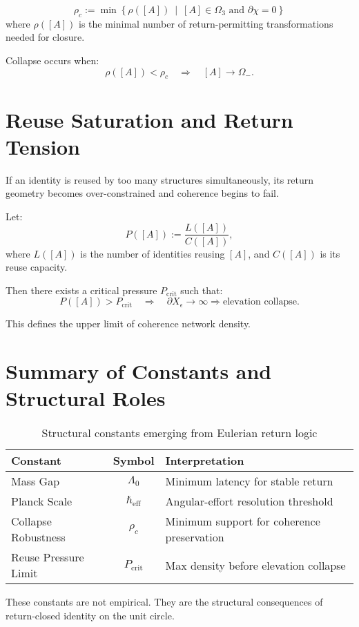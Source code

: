 \begin{definition}
\[
\rho_c := \min \left\{ \rho([A]) \ \middle| \ [A] \in \Omega_3 \text{ and } \partial \chi = 0 \right\}
\]
where $\rho([A])$ is the minimal number of return-permitting transformations needed for closure.
\end{definition}

Collapse occurs when:
\[
\rho([A]) < \rho_c \quad \Rightarrow \quad [A] \to \Omega_-.
\]

\section{Reuse Saturation and Return Tension}

If an identity is reused by too many structures simultaneously, its return geometry becomes over-constrained and coherence begins to fail.

\begin{definition}
Let:
\[
P([A]) := \frac{L([A])}{C([A])},
\]
where $L([A])$ is the number of identities reusing $[A]$, and $C([A])$ is its reuse capacity.
\end{definition}

\noindent Then there exists a critical pressure $P_{\text{crit}}$ such that:
\[
P([A]) > P_{\text{crit}} \quad \Rightarrow \quad \partial X_\epsilon \to \infty \Rightarrow \text{elevation collapse}.
\]

This defines the upper limit of coherence network density.

\section{Summary of Constants and Structural Roles}

\begin{table}[h!]
\centering
\begin{tabular}{|l|c|l|}
\hline
\textbf{Constant} & \textbf{Symbol} & \textbf{Interpretation} \\
\hline
Mass Gap & $\Lambda_0$ & Minimum latency for stable return \\
Planck Scale & $\hbar_{\text{eff}}$ & Angular-effort resolution threshold \\
Collapse Robustness & $\rho_c$ & Minimum support for coherence preservation \\
Reuse Pressure Limit & $P_{\text{crit}}$ & Max density before elevation collapse \\
\hline
\end{tabular}
\caption{Structural constants emerging from Eulerian return logic}
\end{table}

\noindent These constants are not empirical. They are the structural consequences of return-closed identity on the unit circle.
